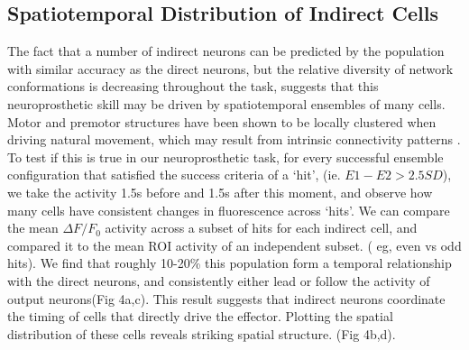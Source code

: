 \documentclass[letterpaper, 10 pt, conference]{ieeeconf}  %
\begin{document}
\subsection{Spatiotemporal Distribution of Indirect Cells }
The fact that a number of indirect neurons can be predicted by the population with similar accuracy as the direct neurons, but the relative diversity of network conformations is decreasing throughout the task,  suggests that this neuroprosthetic skill may be driven by spatiotemporal ensembles of many cells. Motor and premotor structures have been shown to be locally clustered when driving natural movement, which may result from intrinsic connectivity patterns \cite{Markowitz2015-xd,Georgopoulos2007-ct}. To test if this is true in our neuroprosthetic task,  for every successful ensemble configuration that satisfied the success criteria of a `hit', (ie. $E1-E2 > 2.5SD$), we take the activity 1.5s before and 1.5s after this moment, and observe how many cells have consistent changes in fluorescence across `hits'. We can compare the mean $\Delta F/F_{0}$ activity across a subset of hits for each indirect cell, and compared it to the mean ROI activity of an independent subset. ( eg, even vs odd  hits). We find that roughly 10-20\% this population form a temporal relationship with the direct neurons, and consistently either lead or follow the activity of output neurons(Fig 4a,c)\cite{Prsa2017-rn}. This result suggests that indirect neurons coordinate the timing of cells that directly drive the effector. Plotting the spatial distribution of these cells reveals striking spatial structure. (Fig 4b,d). 
\end{document}

